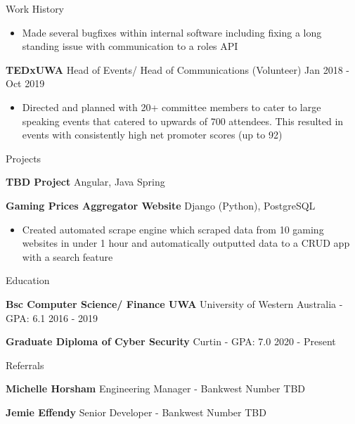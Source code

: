 \documentclass{resume} %
\begin{document}
\begin{rSection}{Work History}
\begin{itemize}
			\item Made several bugfixes within internal software including fixing a long standing issue with communication to a roles API
		\end{itemize}
		\item \textbf{TEDxUWA} {Head of Events/ Head of Communications} (Volunteer) \hfill Jan 2018 - Oct 2019
		\begin{itemize} 
			\item Directed and planned with 20+ committee members to cater to large speaking events that catered to upwards of 700 attendees. This resulted in events with consistently high net promoter scores (up to 92)  
		\end{itemize}
	\end{rSection} 

	\begin{rSection}{Projects}
		\vspace{-1.25em}
		\item \textbf{TBD Project} {Angular, Java Spring}
		\item \textbf{Gaming Prices Aggregator Website} {Django (Python), PostgreSQL} 
		 \begin{itemize} 
		 	\item Created automated scrape engine which scraped data from 10 gaming websites in under 1 hour and automatically outputted data to a CRUD app with a search feature
		 \end{itemize}
	\end{rSection} 

	\begin{rSection}{Education}
		\vspace{-1.25em}
		\item \textbf{Bsc Computer Science/ Finance UWA} {University of Western Australia} - GPA: 6.1 \hfill 2016 - 2019
		\item \textbf{Graduate Diploma of Cyber Security} {Curtin} - GPA: 7.0 \hfill 2020 - Present
	\end{rSection} 
	
	\begin{rSection}{Referrals} 
		\vspace{-1.25em}
		\item \textbf{Michelle Horsham} {Engineering Manager - Bankwest} \hfill Number TBD
		
		\item \textbf{Jemie Effendy} {Senior Developer - Bankwest} \hfill Number TBD
	\end{rSection}
\end{document}
